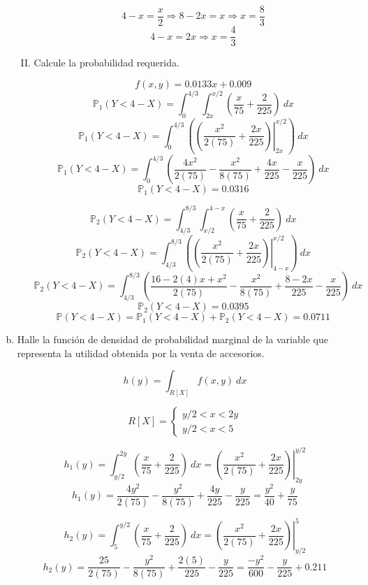 \documentclass[../main.tex]{subfiles}
\begin{document}
\begin{enumerate}[(a)]
\begin{enumerate}[(I)]
$$4 - x = \frac{x}{2} \Rightarrow 8 - 2x = x \Rightarrow x = \frac{8}{3}$$
$$4 - x = 2x \Rightarrow x = \frac{4}{3}$$

\item Calcule la probabilidad requerida.

$$f(x, y) = 0.0133x + 0.009$$
$$\mathbb{P}_{1}(Y < 4 - X) = \int_{0}^{4/3} \int_{2x}^{x/2} \left( \frac{x}{75} + \frac{2}{225} \right) \ dx$$
$$\mathbb{P}_{1}(Y < 4 - X) =\int_{0}^{4/3} \left( \left( \left.\frac{x^2}{2(75)} + \frac{2x}{225}\right)\right\vert_{2x}^{x/2} \right) \ dx$$
$$\mathbb{P}_{1}(Y < 4 - X) =\int_{0}^{4/3} \left(\frac{4x^2}{2(75)} - \frac{x^2}{8(75)} + \frac{4x}{225} - \frac{x}{225}\right) \ dx$$
$$\mathbb{P}_{1}(Y < 4 - X) = 0.0316$$

$$\mathbb{P}_{2}(Y < 4 - X) = \int_{4/3}^{8/3} \int_{x/2}^{4-x} \left( \frac{x}{75} + \frac{2}{225} \right) \ dx$$
$$\mathbb{P}_{2}(Y < 4 - X) = \int_{4/3}^{8/3} \left( \left( \left.\frac{x^2}{2(75)} + \frac{2x}{225}\right)\right\vert_{4-x}^{x/2} \right) \ dx$$
$$\mathbb{P}_{2}(Y < 4 - X) = \int_{4/3}^{8/3} \left( \frac{16-2(4)x + x^2}{2(75)} - \frac{x^2}{8(75)} + \frac{8 - 2x}{225} - \frac{x}{225} \right) \ dx$$
$$\mathbb{P}_{2}(Y < 4 - X) = 0.0395$$
$$\mathbb{P}(Y < 4 - X) = \mathbb{P}_{1}(Y < 4 - X) + \mathbb{P}_{2}(Y < 4 - X)  = 0.0711$$
\end{enumerate}

\item Halle la función de densidad de probabilidad marginal de la variable
que representa la utilidad obtenida por la venta de accesorios.

$$h(y) = \int_{R[X]} f(x, y) \ dx$$

\[ R[X] = \begin{cases} 
      y/2 < x < 2y \\
      y/2 < x < 5
   \end{cases}
\]

$$h_{1}(y) = \int_{y/2}^{2y} \left( \frac{x}{75} + \frac{2}{225} \right) \ dx = \left. \left(\frac{x^2}{2(75)} + \frac{2x}{225}\right)\right\vert_{2y}^{y/2}$$
$$h_{1}(y) = \frac{4y^2}{2(75)} -  \frac{y^2}{8(75)} + \frac{4y}{225} - \frac{y}{225} = \frac{y^2}{40} + \frac{y}{75}$$

$$h_{2}(y) = \int_{5}^{y/2} \left( \frac{x}{75} + \frac{2}{225} \right) \ dx = \left. \left(\frac{x^2}{2(75)} + \frac{2x}{225}\right)\right\vert_{y/2}^{5}$$
$$h_{2}(y) = \frac{25}{2(75)} -  \frac{y^2}{8(75)} + \frac{2(5)}{225} - \frac{y}{225} = \frac{-y^2}{600} - \frac{y}{225} + 0.211$$


\end{enumerate}
\end{document}
